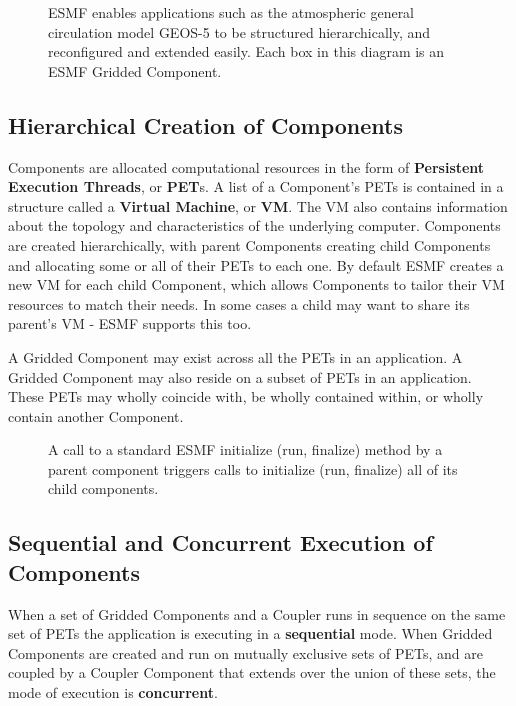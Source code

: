 \begin{center}
\begin{figure}
\caption{ESMF enables applications such as the atmospheric general
circulation model GEOS-5 to be structured hierarchically, and 
reconfigured and extended easily.  Each box in this diagram is an
ESMF Gridded Component.}
\label{fig:GEOS5}
\end{figure}
\end{center}

\subsection{Hierarchical Creation of Components}
\label{sec:hierarchy}

Components are allocated computational resources in the form of
{\bf Persistent Execution Threads}, or {\bf PET}s.  A list of a Component's
PETs is contained in a structure called a {\bf Virtual Machine},
or {\bf VM}.  The VM also contains information about the topology and
characteristics of the underlying computer.
Components are created hierarchically, with parent Components creating
child Components and allocating some or all of their PETs to each one.
By default ESMF creates a new VM for each child Component, which 
allows Components to tailor their VM resources to match their needs.
In some cases a child may want to share its parent's VM - ESMF
supports this too.

A Gridded Component may exist across all the PETs in an application. 
A Gridded Component may also reside on a subset of PETs in an
application.  These PETs may wholly coincide with, be wholly contained
within, or wholly contain another Component.

\begin{center}
\begin{figure}
\caption{A call to a standard ESMF initialize (run, finalize) method
by a parent component triggers calls to initialize (run, finalize)
all of its child components.}
\label{fig:appunit}
\end{figure}
\end{center}

\subsection{Sequential and Concurrent Execution of Components}
\label{sec:concurrency}

When a set of Gridded Components and a Coupler runs in sequence
on the same set of PETs the application is executing in a {\bf sequential}
mode. When Gridded Components are created and run on mutually exclusive
sets of PETs, and are coupled by a Coupler Component that extends over
the union of these sets, the mode of execution is {\bf concurrent}.

